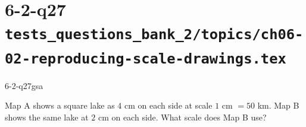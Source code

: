 \documentclass[12pt, fleqn, openany]{studyGuide}
\begin{document}
\newpage
\section*{6-2-q27 \hfill \normalsize\texttt{tests\_questions\_bank\_2/topics/ch06-02-reproducing-scale-drawings.tex}}
\begin{practiceQuestion}{6-2-q27}{gsa}
\begin{questionText}
Map A shows a square lake as $4$ cm on each side at scale $1$ cm $= 50$ km. Map B shows the same lake at $2$ cm on each side. What scale does Map B use?

\begin{center}
\end{center}
\end{questionText}
\end{practiceQuestion}

\newpage
\end{document}
